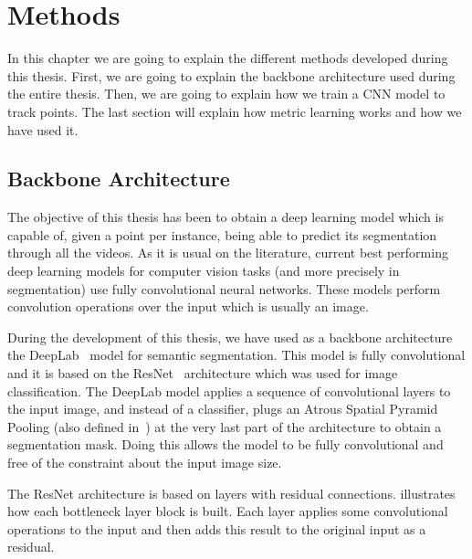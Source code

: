 
\chapter{Methods}
\label{cha:methods}

In this chapter we are going to explain the different methods developed during this thesis.
First, we are going to explain the backbone architecture used during the entire thesis.
Then, we are going to explain how we train a CNN model to track points.
The last section will explain how metric learning works and how we have used it.

\section{Backbone Architecture}
\label{sec:methods:backbonearchitecture}

The objective of this thesis has been to obtain a deep learning model which is capable of, given a point per instance, being able to predict its segmentation through all the videos.
As it is usual on the literature, current best performing deep learning models for computer vision tasks (and more precisely in segmentation) use fully convolutional neural networks.
These models perform convolution operations over the input which is usually an image.

During the development of this thesis, we have used as a backbone architecture the DeepLab~\deeplab{} model for semantic segmentation.
This model is fully convolutional and it is based on the ResNet~\resnet{} architecture which was used for image classification.
The DeepLab model applies a sequence of convolutional layers to the input image, and instead of a classifier, plugs an Atrous Spatial Pyramid Pooling (also defined in~\deeplab{}) at the very last part of the architecture to obtain a segmentation mask.
Doing this allows the model to be fully convolutional and free of the constraint about the input image size.

The ResNet architecture is based on layers with residual connections.
 illustrates how each bottleneck layer block is built.
Each layer applies some convolutional operations to the input and then adds this result to the original input as a residual.

